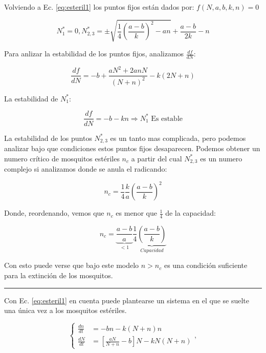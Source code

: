 \documentclass[twocolumn,aps,prl]{revtex4-1}
\newcommand{\Nstar}{N^*}
\newcommand*\sepline{%
  \begin{center}
    \rule[1ex]{.5\textwidth}{.5pt}
  \end{center}}
\begin{document}
Volviendo a Ec. \ref{eq:esteril1} los puntos fijos están dados por: $f(N,a,b,k,n) = 0$


$$
\Nstar_1 = 0, 
\Nstar_{2,3} = \pm 
\sqrt{
    \frac{1}{4} \left( \frac{a-b}{k} \right)^2 - a n 
    }
+ \frac{a-b}{2k} 
- n
$$

Para anlizar la estabilidad de los puntos fijos, analizamos $\frac{d f}{d N}$:

$$
\frac{d f}{d N} = - b + \frac{ aN^2 + 2 a n N}{( N + n )^2}
- k (2N + n)
$$

La estabilidad de $\Nstar_1$:

$$
\frac{d f}{d N} = - b - k  n \Rightarrow  \Nstar_1 \text{ Es estable}
$$

La estabilidad de los puntos $\Nstar_{2,3}$ es un tanto mas complicada, pero podemos analizar bajo que condiciones estos puntos fijos desaparecen. Podemos obtener un numero crítico de mosquitos estériles $n_c$ a partir del cual $\Nstar_{2,3}$ es un numero complejo si analizamos donde se anula el radicando:

$$
n_c =  
\frac{1}{4} 
\frac{k}{a} 
\left( \frac{a-b}{k} \right)^2
$$

Donde, reordenando, vemos que $n_c$ es menor que $ \frac{1}{4} $ de la capacidad:

$$
n_c =  
\underbrace{\frac{a-b}{a} }_{<1}
\frac{1}{4} 
\underbrace{\left( \frac{a-b}{k} \right)}_{Capacidad }
$$

Con esto puede verse que bajo este modelo $n > n_c$ es una condición suficiente para la extinción de los mosquitos.

\sepline

Con Ec. \ref{eq:esteril1} en cuenta puede plantearse un sistema en el que se suelte una única vez a los mosquitos estériles.

\begin{equation}
    \left\lbrace
    \begin{aligned}
        \frac{d n}{d t}&=  -b n - k (N+n) n \\
        \frac{d N}{d t}&=\left[\frac{a N}{N+n}-b\right] N- k N(N+n)
    \end{aligned}
    \right. ,
\end{equation}
\end{document}
